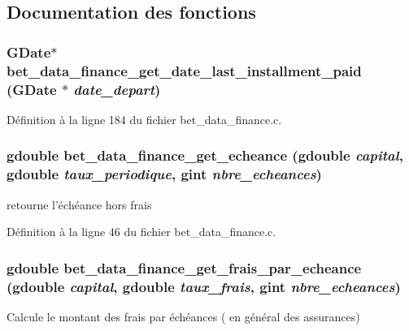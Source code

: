 \subsection{Documentation des fonctions}
\subsubsection[{bet\_\-data\_\-finance\_\-get\_\-date\_\-last\_\-installment\_\-paid}]{\setlength{\rightskip}{0pt plus 5cm}GDate$\ast$ bet\_\-data\_\-finance\_\-get\_\-date\_\-last\_\-installment\_\-paid (GDate $\ast$ {\em date\_\-depart})}\label{bet__data__finance_8c_a458866f9c7b31421885e2c6a6907b35a}


Définition à la ligne 184 du fichier bet\_\-data\_\-finance.c.

\subsubsection[{bet\_\-data\_\-finance\_\-get\_\-echeance}]{\setlength{\rightskip}{0pt plus 5cm}gdouble bet\_\-data\_\-finance\_\-get\_\-echeance (gdouble {\em capital}, \/  gdouble {\em taux\_\-periodique}, \/  gint {\em nbre\_\-echeances})}\label{bet__data__finance_8c_ae0451f64ed5a9f86ac3ceb7d79954ad4}
retourne l'échéance hors frais 

Définition à la ligne 46 du fichier bet\_\-data\_\-finance.c.

\subsubsection[{bet\_\-data\_\-finance\_\-get\_\-frais\_\-par\_\-echeance}]{\setlength{\rightskip}{0pt plus 5cm}gdouble bet\_\-data\_\-finance\_\-get\_\-frais\_\-par\_\-echeance (gdouble {\em capital}, \/  gdouble {\em taux\_\-frais}, \/  gint {\em nbre\_\-echeances})}\label{bet__data__finance_8c_ac0231e5d0ce8fea81b31249558bde098}
Calcule le montant des frais par échéances ( en général des assurances) 

